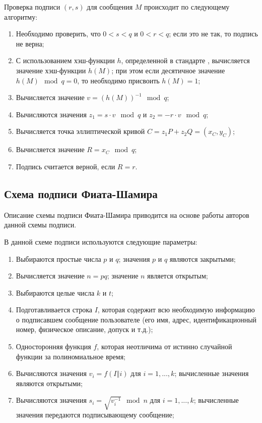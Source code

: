 \documentclass{./civarticle}
\begin{document}
Проверка подписи $(r, s)$ для сообщения $M$ происходит по следующему алгоритму:

\begin{enumerate}
    \item Необходимо проверить, что $0 < s < q$ и $0 < r < q$; если это не так, то подпись не верна;
    \item С использованием хэш-функции $h$, определенной в стандарте \cite{gost11-2018}, вычисляется значение хэш-функции $h(M)$; при этом если десятичное значение $h(M) \mod q = 0$, то необходимо присвоить $h(M) = 1$;
    \item Вычисляется значение $v = (h(M))^{-1} \mod q$;
    \item Вычисляются значения $z_1 = s\cdot v \mod q$ и $z_2 = -r \cdot v \mod q$;
    \item Вычисляется точка эллиптической кривой $C = z_{1}P + z_{2}Q = (x_C, y_C)$;
    \item Вычисляется значение $R = x_C \mod q$;
    \item Подпись считается верной, если $R = r$.
\end{enumerate}

\subsection{Схема подписи Фиата-Шамира}

Описание схемы подписи Фиата-Шамира приводится на основе работы \cite{fiat-shamir} авторов данной схемы подписи.

В данной схеме подписи используются следующие параметры:

\begin{enumerate}
    \item Выбираются простые числа $p$ и $q$; значения $p$ и $q$ являются закрытыми;
    \item Вычисляется значение $n = pq$; значение $n$ является открытым;
    \item Выбираются целые числа $k$ и $t$;
    \item Подготавливается строка $I$, которая содержит всю необходимую информацию о подписавшем сообщение пользователе (его имя, адрес, идентификационный номер, физическое описание, допуск и т.д.);
    \item Односторонняя функция $f$, которая неотличима от истинно случайной функции за полиномиальное время;
    \item Вычисляются значения $v_i = f(I \mathbin\Vert i)$ для $i = 1, ..., k$; вычисленные значения являются открытыми;
    \item Вычисляются значения $s_i = \sqrt{v_i^{-1}} \mod n$ для $i = 1, ..., k$; вычисленные значения передаются подписывающему сообщение;
\end{enumerate}
\end{document}
